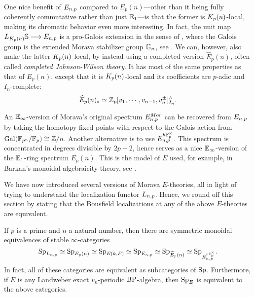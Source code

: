 \begin{remark}
    One nice benefit of $E_{n,p}$ compared to $E_p(n)$---other than it being fully coherently commutative rather than just $\mathbb{E}_1$---is that the former is ${K_p(n)}$-local, making its chromatic behavior even more interesting. In fact, the unit map $L_{{K_p(n)}}\mathbb{S} \longrightarrow E_{n,p}$ is a pro-Galois extension in the sense of \cite{rognes_08}, where the Galois group is the extended Morava stabilizer group $\mathbb{G}_n$, see \cite{devinatz-hopkins_2004}. We can, however, also make the latter ${K_p(n)}$-local, by instead using a completed version $\widehat{E}_p(n)$, often called \emph{completed Johnson-Wilson theory}. It has most of the same properties as that of $E_p(n)$, except that it is ${K_p(n)}$-local and its coefficients are $p$-adic and $I_n$-complete: 
    \[\widehat{E}_p(n)_* \simeq \mathbb{Z}_p[v_1, \cdots, v_{n-1}, v_n^{\pm}]^\wedge_{I_n}.\]
\end{remark}

\begin{remark}
    An $\mathbb{E}_\infty$-version of Morava's original spectrum $E_{n,p}^{Mor}$ can be recovered from $E_{n,p}$ by taking the homotopy fixed points with respect to the Galois action from $\mathrm{Gal}(\mathbb{F}_{p^n}/\mathbb{F}_p)\cong \mathbb{Z}/n$. Another alternative is to use $E_{n,p}^{h\mathbb{F}_p^\times}$. This spectrum is concentrated in degrees divisible by $2p-2$, hence serves as a nice $\mathbb{E}_\infty$-version of the $\mathbb{E}_1$-ring spectrum $E_p(n)$. This is the model of $E$ used, for example, in Barkan's monoidal algebraicity theory, see \cite{barkan_2023}. 
\end{remark}

We have now introduced several versions of Morava $E$-theories, all in light of trying to understand the localization functor $L_{n,p}$. Hence, we round off this section by stating that the Bousfield localizations at any of the above $E$-theories are equivalent. 

\begin{proposition}
    \label{ch0:prop:all-E-local-cats-are-equivalent}
    If $p$ is a prime and $n$ a natural number, then there are symmetric monoidal equivalences of stable $\infty$-categories 
    \[\mathrm{Sp}_{L_{n,p}} \simeq \mathrm{Sp}_{E_p(n)} \simeq \mathrm{Sp}_{E(k,F)}\simeq \mathrm{Sp}_{E_{n,p}} \simeq \mathrm{Sp}_{\widehat{E}_p(n)}\simeq \mathrm{Sp}_{E_{n,p}^{h\mathbb{F}_p^\times}}.\]
    In fact, all of these categories are equivalent as subcategories of $\mathrm{Sp}$. Furthermore, if $E$ is any Landweber exact $v_n$-periodic $\mathrm{BP}$-algebra, then $\mathrm{Sp}_E$ is equivalent to the above categories. 
\end{proposition}

